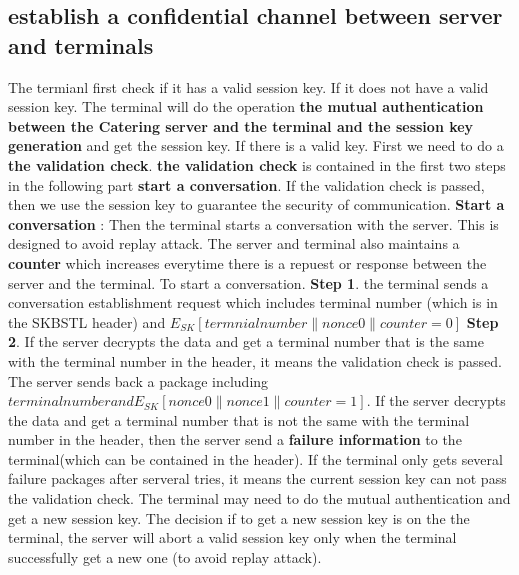 \documentclass{article}
\begin{document}
        \subsection*{establish a confidential channel between server and terminals}
The termianl first check if it has a valid session key. 
If it does not have a valid session key. 
The terminal will do the operation \textbf{the mutual authentication between the Catering server and the terminal and the session key generation} and get the session key.
If there is a valid key. First we need to do a \textbf{the validation check}. 
\textbf{the validation check} is contained in the first two steps in the following part \textbf{start a conversation}.
If the validation check is passed, then we use the session key to guarantee the security of communication. 
        \newline
\textbf{Start a conversation} :
Then the terminal starts a conversation with the server. 
This is designed to avoid replay attack.
The server and terminal also maintains a \textbf{counter} which increases everytime there is a repuest or response between the server and the terminal.
To start a conversation.
        \newline
\textbf{Step 1}. the terminal sends a conversation establishment request which includes terminal number (which is in the SKBSTL header) and $E_{SK}[termnial number \parallel nonce0 \parallel counter = 0]$
        \newline 
\textbf{Step 2}. If the server decrypts the data and get a terminal number that is the same with the terminal number in the header, it means the validation check is passed. The server sends back a package including $terminal number and E_{SK}[nonce0 \parallel nonce1 \parallel counter = 1]$.  
        \newline
If the server decrypts the data and get a terminal number that is not the same with the terminal number in the header, then the server send a \textbf{failure information} to the terminal(which can be contained in the header). 
If the terminal only gets several failure packages after serveral tries, 
it means the current session key can not pass the validation check. 
The terminal may need to do the mutual authentication and get a new session key. 
The decision if to get a new session key is on the the terminal, 
the server will abort a valid session key only when the terminal successfully get a new one (to avoid replay attack).
\end{document}
